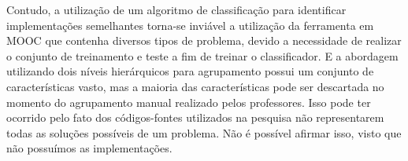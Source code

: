 		Contudo, a utilização de um algoritmo de classificação para identificar
		implementações semelhantes \cite{Taherkhani:2012} torna-se inviável a utilização
		da ferramenta em \acs{MOOC} que contenha diversos tipos de problema, devido a necessidade
		de realizar o conjunto de treinamento e teste a fim de treinar o classificador.
		E a abordagem utilizando dois níveis hierárquicos para agrupamento \cite{Glassman:2014}   %
		possui um conjunto de características vasto, mas a maioria das características pode
		ser descartada no momento do agrupamento manual realizado pelos professores.
		Isso pode ter ocorrido pelo fato dos códigos-fontes utilizados na pesquisa não
		representarem todas as soluções possíveis de um problema. Não é possível afirmar
		isso, visto que não possuímos as implementações.
